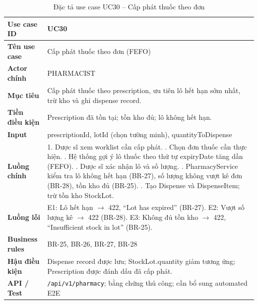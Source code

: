 \begin{table}[H]
\centering
\caption{Đặc tả use case UC30 -- Cấp phát thuốc theo đơn}
\label{tab:uc30}
\begin{tabularx}{\textwidth}{|p{3.6cm}|X|}
\hline
\textbf{Use case ID} & UC30 \\
\hline
\textbf{Tên use case} & Cấp phát thuốc theo đơn (FEFO) \\
\hline
\textbf{Actor chính} & PHARMACIST \\
\hline
\textbf{Mục tiêu} & Cấp phát thuốc theo prescription, ưu tiên lô hết hạn sớm nhất, trừ kho và ghi dispense record. \\
\hline
\textbf{Tiền điều kiện} & Prescription đã tồn tại; tồn kho đủ; lô không hết hạn. \\
\hline
\textbf{Input} & prescriptionId, lotId (chọn tường minh), quantityToDispense \\
\hline
\textbf{Luồng chính} &
1. Dược sĩ xem worklist cần cấp phát. \newline
2. Chọn đơn thuốc cần thực hiện. \newline
3. Hệ thống gợi ý lô thuốc theo thứ tự expiryDate tăng dần (FEFO). \newline
4. Dược sĩ xác nhận lô và số lượng. \newline
5. PharmacyService kiểm tra lô không hết hạn (BR-27), số lượng không vượt kê đơn (BR-28), tồn kho đủ (BR-25). \newline
6. Tạo Dispense và DispenseItem; trừ tồn kho StockLot. \\
\hline
\textbf{Luồng lỗi} & E1: Lô hết hạn $\rightarrow$ 422, ``Lot has expired'' (BR-27). E2: Vượt số lượng kê $\rightarrow$ 422 (BR-28). E3: Không đủ tồn kho $\rightarrow$ 422, ``Insufficient stock in lot'' (BR-25). \\
\hline
\textbf{Business rules} & BR-25, BR-26, BR-27, BR-28 \\
\hline
\textbf{Hậu điều kiện} & Dispense record được lưu; StockLot.quantity giảm tương ứng; Prescription được đánh dấu đã cấp phát. \\
\hline
\textbf{API / Test} & \texttt{/api/v1/pharmacy}; bằng chứng thủ công; cần bổ sung automated E2E \\
\hline
\end{tabularx}
\end{table}


